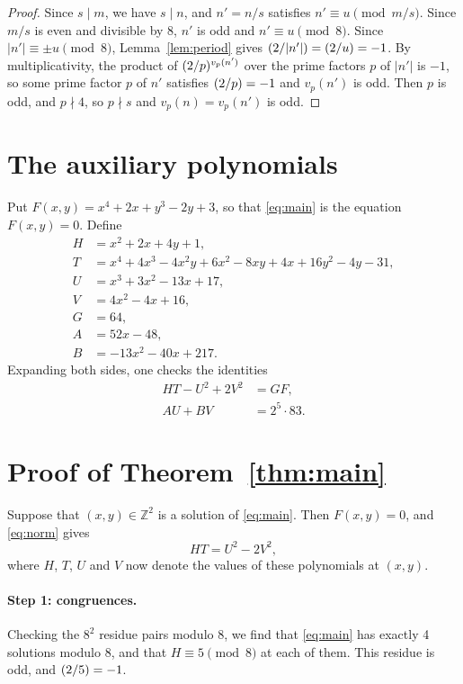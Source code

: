 \documentclass[11pt]{article}
\newcommand{\Z}{\mathbb{Z}}
\newcommand{\leg}[2]{\mathchoice{\biggl(\dfrac{#1}{#2}\biggr)}{(#1/#2)}{(#1/#2)}{(#1/#2)}}
\begin{document}
\begin{proof}
Since $s\mid m$, we have $s\mid n$, and $n'=n/s$ satisfies $n'\equiv u\pmod{m/s}$. Since $m/s$ is even and divisible by $8$, $n'$ is odd and $n'\equiv u\pmod{8}$. Since $|n'|\equiv\pm u\pmod{8}$, Lemma~\ref{lem:period} gives $\leg{2}{|n'|}=\leg{2}{u}=-1$. By multiplicativity, the product of $\leg{2}{p}^{v_p(n')}$ over the prime factors $p$ of $|n'|$ is $-1$, so some prime factor $p$ of $n'$ satisfies $\leg{2}{p}=-1$ and $v_p(n')$ is odd. Then $p$ is odd, and $p\nmid4$, so $p\nmid s$ and $v_p(n)=v_p(n')$ is odd.
\end{proof}

\section{The auxiliary polynomials}

Put $F(x,y)=x^{4}+2x+y^{3}-2y+3$, so that \eqref{eq:main} is the equation $F(x,y)=0$. Define
\begin{align*}
H&=x^{2}+2x+4y+1,\\
T&=x^{4}+4x^{3}-4x^{2}y+6x^{2}-8xy+4x+16y^{2}-4y-31,\\
U&=x^{3}+3x^{2}-13x+17,\\
V&=4x^{2}-4x+16,\\
G&=64,\\
A&=52x-48,\\
B&=-13x^{2}-40x+217.
\end{align*}
Expanding both sides, one checks the identities
\begin{align}
HT-U^2+2V^2&=GF,\label{eq:norm}\\
AU+BV&=2^{5}\cdot 83.\label{eq:bezout}
\end{align}

\section{Proof of Theorem~\ref{thm:main}}

Suppose that $(x,y)\in\Z^2$ is a solution of \eqref{eq:main}. Then $F(x,y)=0$, and \eqref{eq:norm} gives
\begin{equation}\label{eq:HT}
HT=U^2-2V^2,
\end{equation}
where $H$, $T$, $U$ and $V$ now denote the values of these polynomials at $(x,y)$.

\paragraph{Step 1: congruences.} Checking the $8^2$ residue pairs modulo $8$, we find that \eqref{eq:main} has exactly 4 solutions modulo $8$, and that $H\equiv5\pmod{8}$ at each of them. This residue is odd, and $\leg{2}{5}=-1$.
\end{document}
